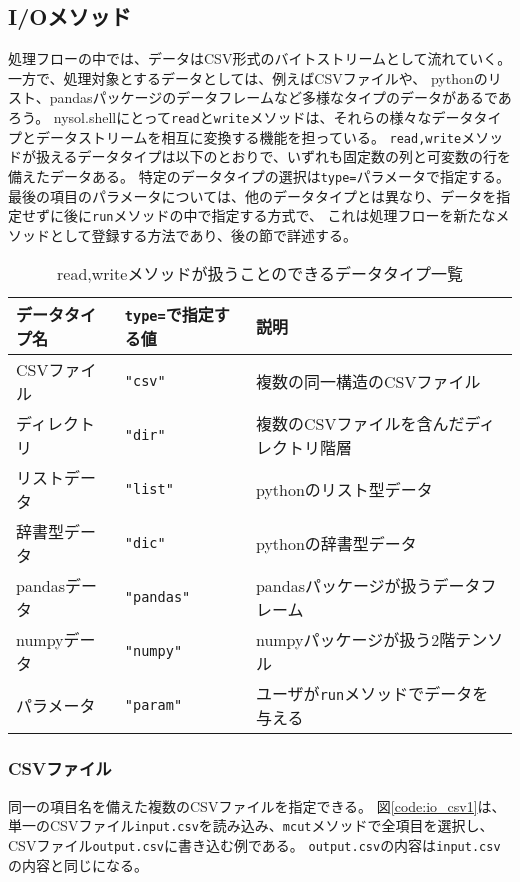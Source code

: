 \subsection{I/Oメソッド}
処理フローの中では、データはCSV形式のバイトストリームとして流れていく。
一方で、処理対象とするデータとしては、例えばCSVファイルや、
pythonのリスト、pandasパッケージのデータフレームなど多様なタイプのデータがあるであろう。
nysol.shellにとって\verb|read|と\verb|write|メソッドは、それらの様々なデータタイプとデータストリームを相互に変換する機能を担っている。
\verb|read,write|メソッドが扱えるデータタイプは以下のとおりで、いずれも固定数の列と可変数の行を備えたデータある。
特定のデータタイプの選択は\verb|type=|パラメータで指定する。
最後の項目のパラメータについては、他のデータタイプとは異なり、データを指定せずに後に\verb|run|メソッドの中で指定する方式で、
これは処理フローを新たなメソッドとして登録する方法であり、後の節で詳述する。

\begin{table}[hbt]
\begin{center}
 \caption{read,writeメソッドが扱うことのできるデータタイプ一覧\label{tbl:nysol.mod_socket}}
{\footnotesize
	\begin{tabular}{l|l|l}
\hline
データタイプ名 & \verb|type=|で指定する値 & 説明 \\
\hline
CSVファイル & \verb|"csv"|    & 複数の同一構造のCSVファイル \\
ディレクトリ& \verb|"dir"|    & 複数のCSVファイルを含んだディレクトリ階層 \\
リストデータ& \verb|"list"|   & pythonのリスト型データ \\
辞書型データ& \verb|"dic"|    & pythonの辞書型データ \\
pandasデータ& \verb|"pandas"| & pandasパッケージが扱うデータフレーム \\
numpyデータ & \verb|"numpy"|  & numpyパッケージが扱う2階テンソル \\
パラメータ  & \verb|"param"|  & ユーザが\verb|run|メソッドでデータを与える \\
\hline
 \end{tabular}
}
\end{center}
\end{table}

\subsubsection*{CSVファイル}
同一の項目名を備えた複数のCSVファイルを指定できる。
図\ref{code:io_csv1}は、単一のCSVファイル\verb|input.csv|を読み込み、\verb|mcut|メソッドで全項目を選択し、
CSVファイル\verb|output.csv|に書き込む例である。
\verb|output.csv|の内容は\verb|input.csv|の内容と同じになる。

